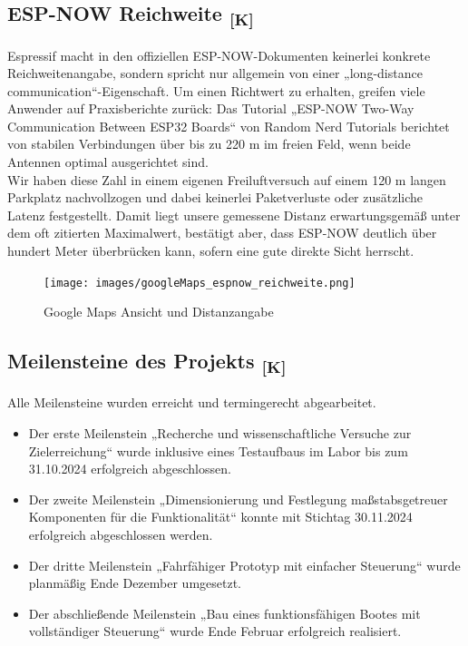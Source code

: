 \documentclass[a4paper,12pt]{article}
\begin{document}
\subsection{\texorpdfstring{ESP-NOW Reichweite \textsubscript{[K]}}{ESP-NOW Reichweite [K]}}
Espressif macht in den offiziellen ESP-NOW-Dokumenten keinerlei konkrete Reichweitenangabe, sondern spricht nur allgemein von einer „long-distance communication“-Eigenschaft. Um einen Richtwert zu erhalten, greifen viele Anwender auf Praxisberichte zurück: Das Tutorial „ESP-NOW Two-Way Communication Between ESP32 Boards“ von Random Nerd Tutorials\cite{RNT2025} berichtet von stabilen Verbindungen über bis zu 220 m im freien Feld, wenn beide Antennen optimal ausgerichtet sind. 
\\[1em]
Wir haben diese Zahl in einem eigenen Freiluftversuch auf einem 120 m langen Parkplatz nachvollzogen und dabei keinerlei Paketverluste oder zusätzliche Latenz festgestellt. Damit liegt unsere gemessene Distanz erwartungsgemäß unter dem oft zitierten Maximalwert, bestätigt aber, dass ESP-NOW deutlich über hundert Meter überbrücken kann, sofern eine gute direkte Sicht herrscht.
\begin{figure}[H]
    \centering
    \texttt{[image: images/googleMaps\_espnow\_reichweite.png]}
    \caption{Google Maps Ansicht und Distanzangabe}
    \label{fig:Google Maps}
\end{figure}

\subsection{\texorpdfstring{Meilensteine des Projekts \textsubscript{[K]}}{Meilensteine des Projekts [K]}}

Alle Meilensteine wurden erreicht und termingerecht abgearbeitet.

\begin{itemize}
    \item Der erste Meilenstein „Recherche und wissenschaftliche Versuche zur Zielerreichung“ wurde inklusive eines Testaufbaus im Labor bis zum 31.10.2024 erfolgreich abgeschlossen.

    \item Der zweite Meilenstein „Dimensionierung und Festlegung maßstabsgetreuer Komponenten für die Funktionalität“ konnte mit Stichtag 30.11.2024 erfolgreich abgeschlossen werden.

    \item Der dritte Meilenstein „Fahrfähiger Prototyp mit einfacher Steuerung“ wurde planmäßig Ende Dezember umgesetzt.

    \item Der abschließende Meilenstein „Bau eines funktionsfähigen Bootes mit vollständiger Steuerung“ wurde Ende Februar erfolgreich realisiert.
\end{itemize}
\end{document}
